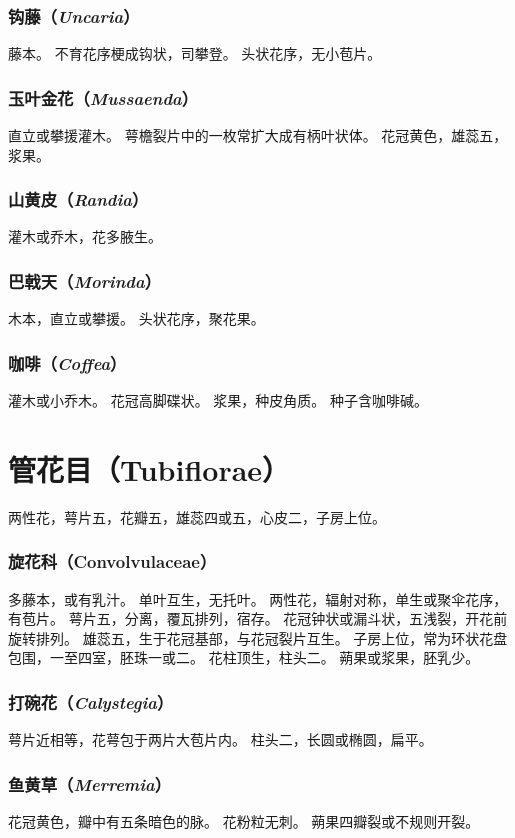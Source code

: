 \documentclass[11pt]{article}
\begin{document}
\begin{sloppypar}
\subsubsection{钩藤（\textit{Uncaria}）}
藤本。
不育花序梗成钩状，司攀登。
头状花序，无小苞片。

\subsubsection{玉叶金花（\textit{Mussaenda}）}
直立或攀援灌木。
萼檐裂片中的一枚常扩大成有柄叶状体。
花冠黄色，雄蕊五，浆果。

\subsubsection{山黄皮（\textit{Randia}）}
灌木或乔木，花多腋生。

\subsubsection{巴戟天（\textit{Morinda}）}
木本，直立或攀援。
头状花序，聚花果。

\subsubsection{咖啡（\textit{Coffea}）}
灌木或小乔木。
花冠高脚碟状。
浆果，种皮角质。
种子含咖啡碱。

\section{管花目（Tubiflorae）}
两性花，萼片五，花瓣五，雄蕊四或五，心皮二，子房上位。

\subsubsection{旋花科（Convolvulaceae）}
多藤本，或有乳汁。
单叶互生，无托叶。
两性花，辐射对称，单生或聚伞花序，有苞片。
萼片五，分离，覆瓦排列，宿存。
花冠钟状或漏斗状，五浅裂，开花前旋转排列。
雄蕊五，生于花冠基部，与花冠裂片互生。
子房上位，常为环状花盘包围，一至四室，胚珠一或二。
花柱顶生，柱头二。
蒴果或浆果，胚乳少。

\subsubsection{打碗花（\textit{Calystegia}）}
萼片近相等，花萼包于两片大苞片内。
柱头二，长圆或椭圆，扁平。

\subsubsection{鱼黄草（\textit{Merremia}）}
花冠黄色，瓣中有五条暗色的脉。
花粉粒无刺。
蒴果四瓣裂或不规则开裂。


\end{sloppypar}
\end{document}
